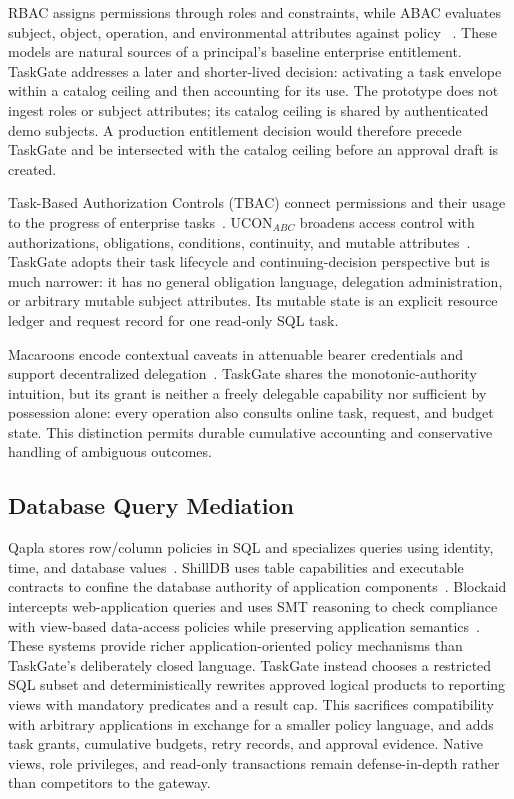 \documentclass[10pt,journal,compsoc]{IEEEtran}
\newcommand{\system}{TaskGate\xspace}
\begin{document}
RBAC assigns permissions through roles and constraints, while ABAC evaluates
subject, object, operation, and environmental attributes against policy
~\cite{ferraiolo2001rbac,hu2019abac}.  These models are natural sources of a
principal's baseline enterprise entitlement.  \system addresses a later and
shorter-lived decision: activating a task envelope within a catalog ceiling and
then accounting for its use.  The prototype does not ingest roles or subject
attributes; its catalog ceiling is shared by authenticated demo subjects.  A
production entitlement decision would therefore precede \system and be
intersected with the catalog ceiling before an approval draft is created.

Task-Based Authorization Controls (TBAC) connect permissions and their usage to
the progress of enterprise tasks~\cite{thomas1998tbac}.  UCON$_{ABC}$ broadens
access control with authorizations, obligations, conditions, continuity, and
mutable attributes~\cite{park2004ucon}.  \system adopts their task lifecycle
and continuing-decision perspective but is much narrower: it has no general
obligation language, delegation administration, or arbitrary mutable subject
attributes.  Its mutable state is an explicit resource ledger and request
record for one read-only SQL task.

Macaroons encode contextual caveats in attenuable bearer credentials and support
decentralized delegation~\cite{birgisson2014macaroons}.  \system shares the
monotonic-authority intuition, but its grant is neither a freely delegable
capability nor sufficient by possession alone: every operation also consults
online task, request, and budget state.  This distinction permits durable
cumulative accounting and conservative handling of ambiguous outcomes.

\subsection{Database Query Mediation}

Qapla stores row/column policies in SQL and specializes queries using identity,
time, and database values~\cite{mehta2017qapla}.  ShillDB uses table capabilities
and executable contracts to confine the database authority of application
components~\cite{zigmond2020shilldb}.  Blockaid intercepts web-application
queries and uses SMT reasoning to check compliance with view-based data-access
policies while preserving application semantics~\cite{zhang2022blockaid}.
These systems provide richer application-oriented policy mechanisms than
\system's deliberately closed language.  \system instead chooses a restricted
SQL subset and deterministically rewrites approved logical products to reporting
views with mandatory predicates and a result cap.  This sacrifices
compatibility with arbitrary applications in exchange for a smaller policy
language, and adds task grants, cumulative budgets, retry records, and
approval evidence.  Native views, role privileges, and read-only transactions
remain defense-in-depth rather than competitors to the gateway.
\end{document}
